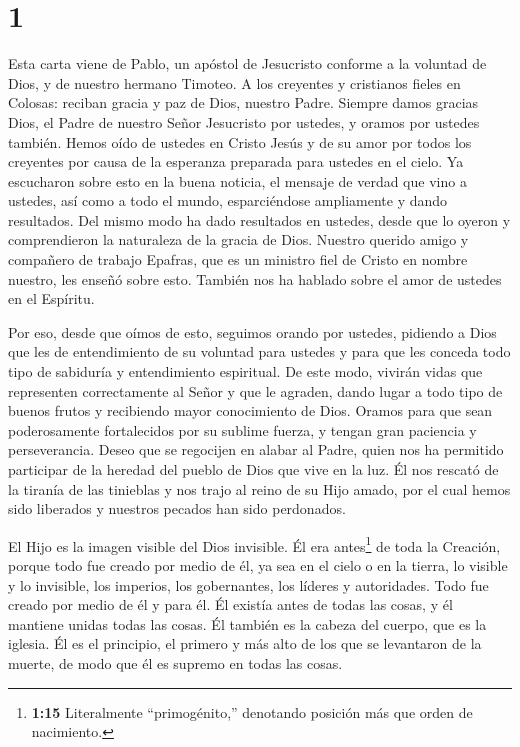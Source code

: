 \hypertarget{section}{%
\section{1}\label{section}}

 Esta carta viene de Pablo, un apóstol de Jesucristo
conforme a la voluntad de Dios, y de nuestro hermano Timoteo.
 A los creyentes y cristianos fieles en Colosas: reciban
gracia y paz de Dios, nuestro Padre.  Siempre damos gracias
Dios, el Padre de nuestro Señor Jesucristo por ustedes, y oramos por
ustedes también.  Hemos oído de ustedes en Cristo Jesús y de
su amor por todos los creyentes  por causa de la esperanza
preparada para ustedes en el cielo. Ya escucharon sobre esto en la buena
noticia, el mensaje de verdad  que vino a ustedes, así como
a todo el mundo, esparciéndose ampliamente y dando resultados. Del mismo
modo ha dado resultados en ustedes, desde que lo oyeron y comprendieron
la naturaleza de la gracia de Dios.  Nuestro querido amigo y
compañero de trabajo Epafras, que es un ministro fiel de Cristo en
nombre nuestro, les enseñó sobre esto.  También nos ha
hablado sobre el amor de ustedes en el Espíritu.

 Por eso, desde que oímos de esto, seguimos orando por
ustedes, pidiendo a Dios que les de entendimiento de su voluntad para
ustedes y para que les conceda todo tipo de sabiduría y entendimiento
espiritual.  De este modo, vivirán vidas que representen
correctamente al Señor y que le agraden, dando lugar a todo tipo de
buenos frutos y recibiendo mayor conocimiento de Dios. 
Oramos para que sean poderosamente fortalecidos por su sublime fuerza, y
tengan gran paciencia y perseverancia.  Deseo que se
regocijen en alabar al Padre, quien nos ha permitido participar de la
heredad del pueblo de Dios que vive en la luz.  Él nos
rescató de la tiranía de las tinieblas y nos trajo al reino de su Hijo
amado,  por el cual hemos sido liberados y nuestros pecados
han sido perdonados.

 El Hijo es la imagen visible del Dios invisible. Él era
antes\footnote{\textbf{1:15} Literalmente ``primogénito,'' denotando
  posición más que orden de nacimiento.} de toda la Creación,
 porque todo fue creado por medio de él, ya sea en el cielo
o en la tierra, lo visible y lo invisible, los imperios, los
gobernantes, los líderes y autoridades. Todo fue creado por medio de él
y para él.  Él existía antes de todas las cosas, y él
mantiene unidas todas las cosas.  Él también es la cabeza
del cuerpo, que es la iglesia. Él es el principio, el primero y más alto
de los que se levantaron de la muerte, de modo que él es supremo en
todas las cosas.

